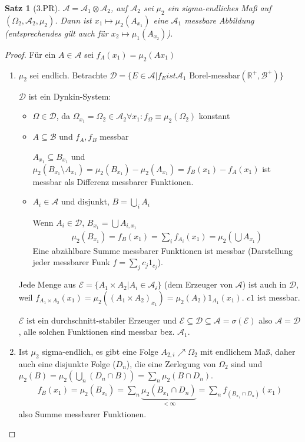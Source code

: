 \documentclass[]{article}
\newtheorem{theorem}{Satz}
\begin{document}
\begin{theorem}[3.PR]
	$\mathcal{A}=\mathcal{A}_1\otimes\mathcal{A}_2$, auf $\mathcal{A}_2$ sei $\mu_2$ ein sigma-endliches Maß auf $(\Omega_2,\mathcal{A}_2,\mu_2)$. Dann ist $x_1 \mapsto \mu_2(A_{x_1})$ eine $\mathcal{A}_1$ messbare Abbildung (entsprechendes gilt auch für $x_2 \mapsto \mu_1(A_{x_2})$).
\end{theorem}
\begin{proof}
	Für ein $A\in\mathcal{A}$ sei $f_A(x_1)=\mu_2(Ax_1)$
	\begin{enumerate}
		\item $\mu_2$ sei endlich. Betrachte $\mathcal{D}=\{E\in\mathcal{A}|f_E ist \mathcal{A}_1 \text{ Borel-messbar} (\mathbb{R}^+,\mathcal{B}^+)\}$
		
		$\mathcal{D}$ ist ein Dynkin-System:
		\begin{itemize}
			\item $\Omega \in \mathcal{D}$, da $\Omega_{x_1}=\Omega_2 \in \mathcal{A}_2 \forall x_1 : f_\Omega \equiv \mu_2(\Omega_2)$ konstant
			
			\item $A\subseteq\mathcal{B}$ und $f_A,f_B$ messbar
			
			$A_{x_1} \subseteq B_{x_1}$ und $\mu_2(B_{x_1}\setminus A_{x_1}) = \mu_2(B_{x_1}) - \mu_2(A_{x_1}) = f_B(x_1) - f_A(x_1)$ ist messbar als Differenz messbarer Funktionen.
			
			\item $A_i \in \mathcal{A}$ und disjunkt, $B=\bigcup_{i}A_i$
			
			Wenn $A_i \in \mathcal{D}$, $B_{x_1} = \bigcup A_{i,x_1}$
			\begin{align*}
				\mu_2(B_{x_1}) = f_B(x_1) = \sum_i f_{A_i}(x_1) = \mu_2(\bigcup A_{x_1})
			\end{align*}
			Eine abzählbare Summe messbarer Funktionen ist messbar (Darstellung jeder messbarer Funk $f=\sum_j c_j 1_{c_j}$).
		\end{itemize}
	
		Jede Menge aus $\mathcal{E}=\{A_1\times A_2 | A_i \in \mathcal{A_i}\}$ (dem Erzeuger von $\mathcal{A}$) ist auch in $\mathcal{D}$, weil $f_{A_1\times A_2}(x_1) = \mu_2((A_1\times A_2)_{x_1}) = \mu_2(A_2) 1_{A_1}(x_1)$. $c1$ ist messbar.
		
		$\mathcal{E}$ ist ein durchschnitt-stabiler Erzeuger und $\mathcal{E}\subseteq\mathcal{D}\subseteq\mathcal{A}=\sigma(\mathcal{E})$ also $\mathcal{A}=\mathcal{D}$, alle solchen Funktionen sind messbar bez. $\mathcal{A_1}$.
		
		\item Ist $\mu_2$ sigma-endlich, es gibt eine Folge $A_{2,i}\nearrow\Omega_2$ mit endlichem Maß, daher auch eine disjunkte Folge ($D_n$), die eine Zerlegung von $\Omega_2$ sind und $\mu_2(B) = \mu_2(\bigcup_n(D_n\cap B)) = \sum_n \mu_2(B\cap D_n)$.
		\begin{align*}
			f_B(x_1) = \mu_2(B_{x_1}) = \sum_n \underbrace{\mu_2(B_{x_1} \cap D_n)}_{<\infty} = \sum_n f_{(B_{x_1}\cap D_n)}(x_1)
		\end{align*}
		also Summe messbarer Funktionen.
	\end{enumerate}
\end{proof}
\end{document}
